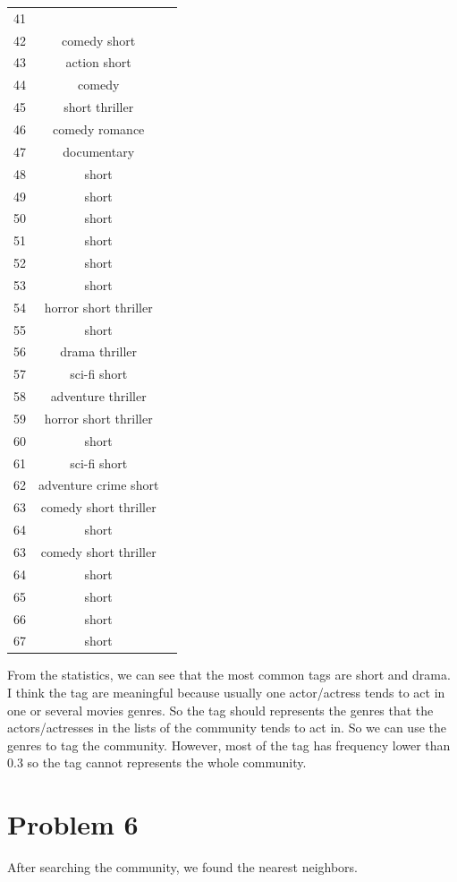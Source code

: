 \documentclass{article}
\begin{document}
\begin {table}[htbp]
\begin{adjustbox}{center}
\begin{tabular}{|c|c|c}
41&\\
42&comedy short\\
43&action short\\
44& comedy\\
45&short thriller\\
46&comedy romance\\
47&documentary\\
48&short\\
49&short\\
50&short\\
51&short\\
52&short\\
53&short\\
54&horror short thriller\\
55&short\\
56&drama thriller\\
57& sci-fi short\\
58&adventure thriller\\
59&horror short thriller\\
60&short\\
61& sci-fi short\\
62&adventure crime short\\
63&comedy short thriller\\
64& short\\
63&comedy short thriller\\
64& short\\
65&short\\
66& short\\
67&short\\

\end{tabular}
\end{adjustbox}
\end{table}
\newpage
From the statistics, we can see that the most common tags are short and drama.
I think the tag are meaningful because usually one actor/actress tends to act in one or several movies genres. So the tag should represents the genres that the actors/actresses in the lists of the community tends to act in. 
So we can use the genres to tag the community.
However, most of the tag has frequency lower than 0.3 so the tag cannot represents the whole community.
\section{Problem 6}
After searching the community, we found the nearest neighbors.\\
\end{document}
